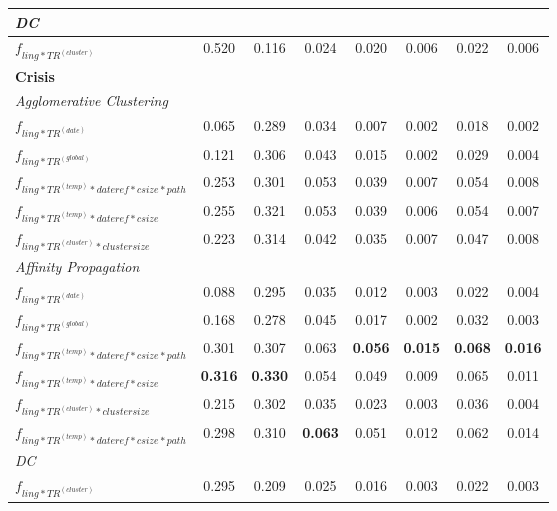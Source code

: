 \documentclass[a4paper,BCOR=10mm]{report}
\numberwithin{lemma}{chapter}
\numberwithin{definition}{chapter}
\begin{document}
\begin{table}
\begin{centering}
{\begin{tabular}{|l|ccccccc|}
\multicolumn{ 8 }{|l|}{ \textit{ DC } }\\\hline
$f_{ \mathit{ling}*TR^{(cluster)} }$   & 0.520    & 0.116 & 0.024 & 0.020 & 0.006 & 0.022 & 0.006 \\\hline
\multicolumn{ 8 }{|l|}{ \textbf{ Crisis } }\\\hline
\multicolumn{ 8 }{|l|}{ \textit{ Agglomerative Clustering } }\\\hline
$f_{ ling*TR^{(date)} }$     & 0.065    & 0.289 & 0.034 & 0.007 & 0.002 & 0.018 & 0.002 \\\hline
$f_{ ling*TR^{(global)} }$   & 0.121    & 0.306 & 0.043 & 0.015 & 0.002 & 0.029 & 0.004 \\\hline
$f_{ ling*TR^{(temp)}*\mathit{dateref}*\mathit{csize}*\mathit{path} }$     & 0.253    & 0.301 & 0.053 & 0.039 & 0.007 & 0.054 & 0.008 \\\hline
$f_{ ling*TR^{(temp)}*\mathit{dateref}*\mathit{csize} }$     & 0.255    & 0.321 & 0.053 & 0.039 & 0.006 & 0.054 & 0.007 \\\hline
$f_{ \mathit{ling}*TR^{(cluster)}*\mathit{cluster size} }$   & 0.223    & 0.314 & 0.042 & 0.035 & 0.007 & 0.047 & 0.008 \\\hline
\multicolumn{ 8 }{|l|}{ \textit{ Affinity Propagation } }\\\hline
$f_{ ling*TR^{(date)} }$     & 0.088    & 0.295 & 0.035 & 0.012 & 0.003 & 0.022 & 0.004 \\\hline
$f_{ ling*TR^{(global)} }$   & 0.168    & 0.278 & 0.045 & 0.017 & 0.002 & 0.032 & 0.003 \\\hline
$f_{ ling*TR^{(temp)}*\mathit{dateref}*\mathit{csize}*\mathit{path} }$     & 0.301    & 0.307 & 0.063 & \textbf{ 0.056 }  & \textbf{ 0.015 }  & \textbf{ 0.068 }  & \textbf{ 0.016 } \\\hline
$f_{ ling*TR^{(temp)}*\mathit{dateref}*\mathit{csize} }$     & \textbf{ 0.316 } & \textbf{ 0.330 }  & 0.054 & 0.049 & 0.009 & 0.065 & 0.011 \\\hline
$f_{ \mathit{ling}*TR^{(cluster)}*\mathit{cluster size} }$   & 0.215    & 0.302 & 0.035 & 0.023 & 0.003 & 0.036 & 0.004 \\\hline
$f_{ ling*TR^{(temp)}*\mathit{dateref}*\mathit{csize}*\mathit{path} }$     & 0.298    & 0.310 & \textbf{ 0.063 }  & 0.051 & 0.012 & 0.062 & 0.014 \\\hline
\multicolumn{ 8 }{|l|}{ \textit{ DC } }\\\hline
$f_{ \mathit{ling}*TR^{(cluster)} }$   & 0.295    & 0.209 & 0.025 & 0.016 & 0.003 & 0.022 & 0.003 \\\hline
\end{tabular}
}
\end{centering}
\end{table}
\end{document}
